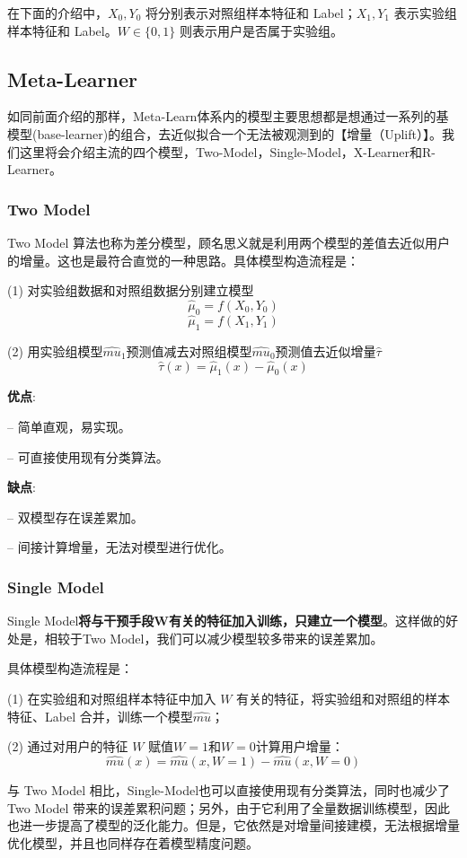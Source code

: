 \documentclass[12pt]{article}
\begin{document}
在下面的介绍中，$X_0, Y_0$ 将分别表示对照组样本特征和 Label；$X_1, Y_1$ 表示实验组样本特征和 Label。$W \in \{0, 1\}$ 则表示用户是否属于实验组。

\subsection{Meta-Learner}
如同前面介绍的那样，Meta-Learn体系内的模型主要思想都是想通过一系列的基模型(base-learner)的组合，去近似拟合一个无法被观测到的【增量（Uplift）】。我们这里将会介绍主流的四个模型，Two-Model，Single-Model，X-Learner和R-Learner。

\subsubsection{Two Model}
Two Model 算法也称为差分模型，顾名思义就是利用两个模型的差值去近似用户的增量。这也是最符合直觉的一种思路。具体模型构造流程是：

(1) 对实验组数据和对照组数据分别建立模型
$$
\hat{\mu}_0 = f(X_0, Y_0)
$$
$$
\hat{\mu}_1 = f(X_1, Y_1)
$$

(2) 用实验组模型$\hat{mu}_1$预测值减去对照组模型$\hat{mu}_0$预测值去近似增量$\hat{\tau}$
$$
\hat{\tau}(x) = \hat{\mu}_1(x) - \hat{\mu}_0(x)
$$

\textbf{优点}:

– 简单直观，易实现。

– 可直接使用现有分类算法。

\textbf{缺点}:

– 双模型存在误差累加。

– 间接计算增量，无法对模型进行优化。

\subsubsection{Single Model}
Single Model\textbf{将与干预手段W有关的特征加入训练，只建立一个模型}。这样做的好处是，相较于Two Model，我们可以减少模型较多带来的误差累加。

具体模型构造流程是：

(1) 在实验组和对照组样本特征中加入 $W$ 有关的特征，将实验组和对照组的样本特征、Label 合并，训练一个模型$\hat{mu}$；

(2) 通过对用户的特征 $W$ 赋值$W=1$和$W=0$计算用户增量：
$$
\hat{mu}(x) = \hat{mu}(x, W = 1) - \hat{mu}(x, W = 0)
$$

与 Two Model 相比，Single-Model也可以直接使用现有分类算法，同时也减少了 Two Model 带来的误差累积问题；另外，由于它利用了全量数据训练模型，因此也进一步提高了模型的泛化能力。但是，它依然是对增量间接建模，无法根据增量优化模型，并且也同样存在着模型精度问题。
\end{document}
